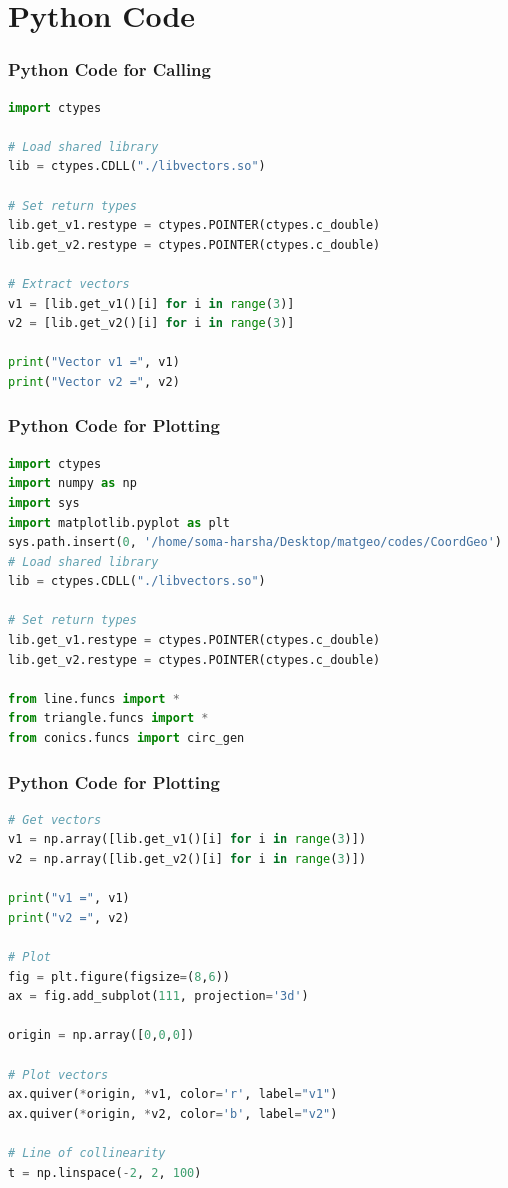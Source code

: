 \documentclass{beamer}
\theoremstyle{remark}
\numberwithin{equation}{section}
\begin{document}
\section{Python Code}
\begin{frame}[fragile]
\frametitle{Python Code for Calling}
\begin{lstlisting}[language=Python]
import ctypes

# Load shared library
lib = ctypes.CDLL("./libvectors.so")

# Set return types
lib.get_v1.restype = ctypes.POINTER(ctypes.c_double)
lib.get_v2.restype = ctypes.POINTER(ctypes.c_double)

# Extract vectors
v1 = [lib.get_v1()[i] for i in range(3)]
v2 = [lib.get_v2()[i] for i in range(3)]

print("Vector v1 =", v1)
print("Vector v2 =", v2)

\end{lstlisting}
\end{frame}

\begin{frame}[fragile]
\frametitle{Python Code for Plotting}
\begin{lstlisting}[language=Python]
import ctypes
import numpy as np
import sys
import matplotlib.pyplot as plt
sys.path.insert(0, '/home/soma-harsha/Desktop/matgeo/codes/CoordGeo')
# Load shared library
lib = ctypes.CDLL("./libvectors.so")

# Set return types
lib.get_v1.restype = ctypes.POINTER(ctypes.c_double)
lib.get_v2.restype = ctypes.POINTER(ctypes.c_double)

from line.funcs import *
from triangle.funcs import *
from conics.funcs import circ_gen

\end{lstlisting}
\end{frame}

\begin{frame}[fragile]
\frametitle{Python Code for Plotting}
\begin{lstlisting}[language=Python]
# Get vectors
v1 = np.array([lib.get_v1()[i] for i in range(3)])
v2 = np.array([lib.get_v2()[i] for i in range(3)])

print("v1 =", v1)
print("v2 =", v2)

# Plot
fig = plt.figure(figsize=(8,6))
ax = fig.add_subplot(111, projection='3d')

origin = np.array([0,0,0])

# Plot vectors
ax.quiver(*origin, *v1, color='r', label="v1")
ax.quiver(*origin, *v2, color='b', label="v2")

# Line of collinearity
t = np.linspace(-2, 2, 100)

\end{lstlisting}
\end{frame}
\end{document}
